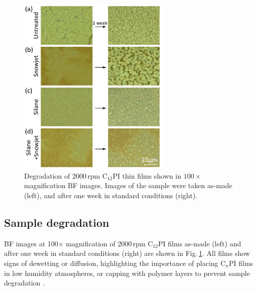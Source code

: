 \begin{figure}[h!]
\centering
\includegraphics[width=0.65\textwidth]{Fig4}
\caption{Degradation of 2000\,rpm C$_{12}$PI thin films shown in $100\times$ magnification BF images. Images of the sample were taken as-made (left), and after one week in standard conditions (right).}
\label{4Fig4}
\end{figure}
\subsection{Sample degradation}
BF images at 100$\times$ magnification of 2000\,rpm C$_{12}$PI films as-made (left) and after one week in standard conditions (right) are shown in Fig.\,\ref{4Fig4}. All films show signs of dewetting or diffusion, highlighting the importance of placing C$_n$PI films in low humidity atmospheres, or capping with polymer layers to prevent sample degradation \cite{Pradeesh2009}.

